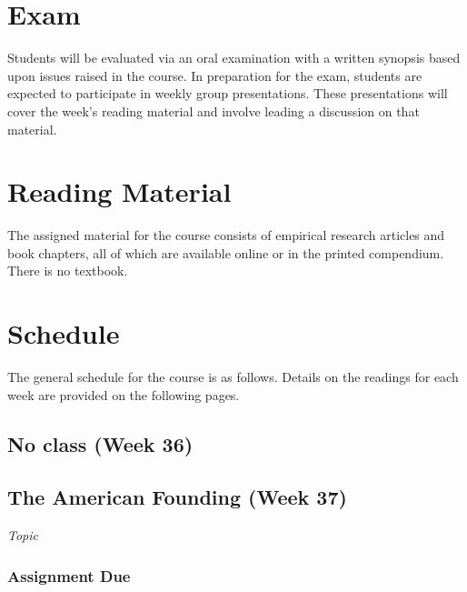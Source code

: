 \documentclass[12pt,a4paper]{article}
\begin{document}
\section{Exam}
Students will be evaluated via an oral examination with a written synopsis based upon issues raised in the course. In preparation for the exam, students are expected to participate in weekly group presentations. These presentations will cover the week's reading material and involve leading a discussion on that material.

\section{Reading Material}
The assigned material for the course consists of empirical research articles and book chapters, all of which are available online or in the printed compendium. There is no textbook.

\section{Schedule}
The general schedule for the course is as follows. Details on the readings for each week are provided on the following pages.

\secttoc


\clearpage


\subsection{No class (Week 36)}
\vspace{1em}


\clearpage
\subsection{The American Founding (Week 37)}
\emph{Topic}

\vspace{1em}
\subsubsection*{Assignment Due}
\end{document}
